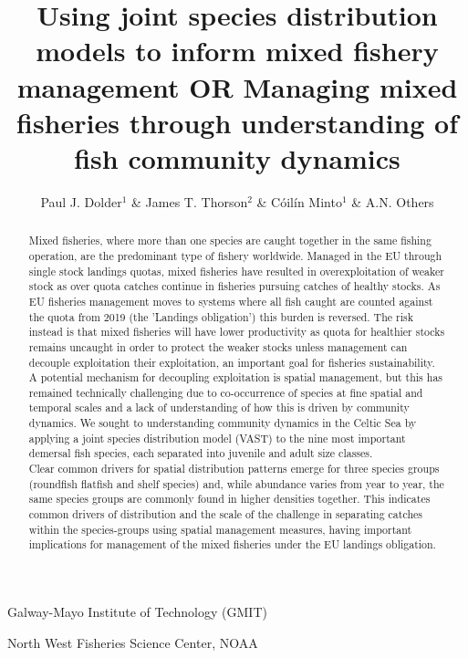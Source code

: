 \documentclass{nature}
\title{Using joint species distribution models to inform mixed fishery
	management OR Managing mixed fisheries through understanding of fish
	community dynamics}
\author{Paul J. Dolder$^1$ \& James T. Thorson$^2$ \& Cóilín Minto$^1$ \& A.N.
Others}
\begin{document}
\maketitle

\begin{affiliations}
\item Galway-Mayo Institute of Technology (GMIT) 
\item North West Fisheries Science Center, NOAA
\end{affiliations}

\begin{linenumbers}

\begin{abstract} 
Mixed fisheries, where more than one species are caught together in the same
fishing operation, are the predominant type of fishery worldwide. Managed in
the EU through single stock landings quotas, mixed fisheries have resulted in
overexploitation of weaker stock as over quota catches continue in fisheries
pursuing catches of healthy stocks. As EU fisheries management moves to systems
where all fish caught are counted against the quota from 2019 (the 'Landings
obligation') this burden is reversed. The risk instead is that mixed fisheries
will have lower productivity as quota for healthier stocks remains uncaught in
order to protect the weaker stocks unless management can decouple exploitation
their exploitation, an important goal for fisheries sustainability.  A
potential mechanism for decoupling exploitation is spatial management, but this
has remained technically challenging due to co-occurrence of species at fine
spatial and temporal scales and a lack of understanding of how this is driven
by community dynamics.  We sought to understanding community dynamics in the
Celtic Sea by applying a joint species distribution model (VAST) to the nine
most important demersal fish species, each separated into juvenile and adult
size classes.  \\

Clear common drivers for spatial distribution patterns emerge for three species
groups (roundfish flatfish and shelf species) and, while abundance varies from
year to year, the same species groups are commonly found in higher densities
together. This indicates common drivers of distribution and the scale of the
challenge in separating catches within the species-groups using spatial
management measures, having important implications for management of the mixed
fisheries under the EU landings obligation.


\end{abstract}
\end{linenumbers}
\end{document}
